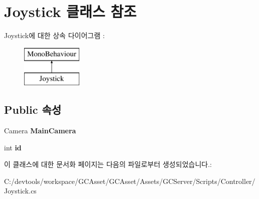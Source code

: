 \hypertarget{class_joystick}{}\section{Joystick 클래스 참조}
\label{class_joystick}
Joystick에 대한 상속 다이어그램 \+: \begin{figure}[H]
\begin{center}
\leavevmode
\includegraphics[height=2.000000cm]{class_joystick}
\end{center}
\end{figure}
\subsection*{Public 속성}
\begin{DoxyCompactItemize}
\item 
\hypertarget{class_joystick_a26ad6d0d6c482b11696e1174a7371632}{}Camera {\bfseries Main\+Camera}\label{class_joystick_a26ad6d0d6c482b11696e1174a7371632}

\item 
\hypertarget{class_joystick_a394d8dae4d08c353281f6958d870f15f}{}int {\bfseries id}\label{class_joystick_a394d8dae4d08c353281f6958d870f15f}

\end{DoxyCompactItemize}


이 클래스에 대한 문서화 페이지는 다음의 파일로부터 생성되었습니다.\+:\begin{DoxyCompactItemize}
\item 
C\+:/devtools/workspace/\+G\+C\+Asset/\+G\+C\+Asset/\+Assets/\+G\+C\+Server/\+Scripts/\+Controller/Joystick.\+cs\end{DoxyCompactItemize}
